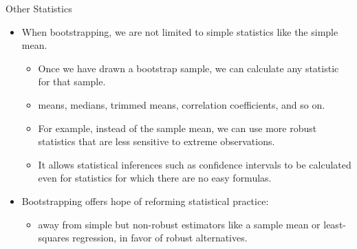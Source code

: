 \documentclass[
  ignorenonframetext,
]{beamer}
\providecommand{\tightlist}{%
  \setlength{\itemsep}{0pt}\setlength{\parskip}{0pt}}
\begin{document}
\begin{frame}{Other Statistics}
\protect\hypertarget{other-statistics}{}
\begin{itemize}
\item
  When bootstrapping, we are not limited to simple statistics like the
  simple mean.

  \begin{itemize}
  \tightlist
  \item
    Once we have drawn a bootstrap sample, we can calculate any
    statistic for that sample.
  \item
    means, medians, trimmed means, correlation coefficients, and so on.
  \item
    For example, instead of the sample mean, we can use more robust
    statistics that are less sensitive to extreme observations.
  \item
    It allows statistical inferences such as confidence intervals to be
    calculated even for statistics for which there are no easy formulas.
  \end{itemize}
\item
  Bootstrapping offers hope of reforming statistical practice:

  \begin{itemize}
  \tightlist
  \item
    away from simple but non-robust estimators like a sample mean or
    least-squares regression, in favor of robust alternatives.
  \end{itemize}
\end{itemize}
\end{frame}
\end{document}
